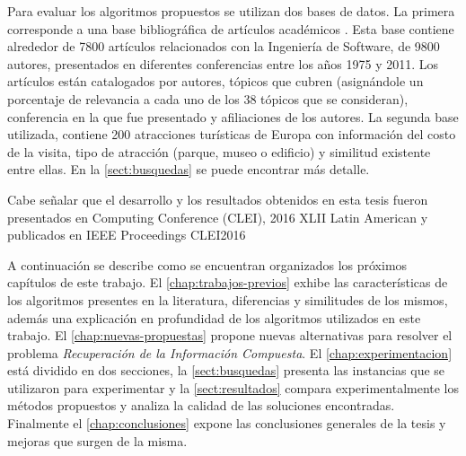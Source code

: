 Para evaluar los algoritmos propuestos se utilizan dos bases de datos. La primera corresponde a una base bibliográfica de artículos académicos \cite{dataDrive}. Esta base contiene alrededor de 7800 artículos relacionados con la Ingeniería de Software, de 9800 autores, presentados en diferentes conferencias entre los años 1975 y 2011. Los artículos están catalogados por autores, tópicos que cubren (asignándole un porcentaje de relevancia a cada uno de los 38 tópicos que se consideran), conferencia en la que fue presentado y afiliaciones de los autores. La segunda base utilizada, contiene 200 atracciones turísticas de Europa con información del costo de la visita, tipo de atracción (parque, museo o edificio) y similitud existente entre ellas. En la \autoref{sect:busquedas} se puede encontrar más detalle.

Cabe señalar que el desarrollo y los resultados obtenidos en esta tesis fueron presentados en  Computing Conference (CLEI), 2016 XLII Latin American y publicados en IEEE Proceedings CLEI2016 \cite{7833376}

A continuación se describe como se encuentran organizados los próximos capítulos de este trabajo. El \autoref{chap:trabajos-previos} exhibe las características de los algoritmos presentes en la literatura, diferencias y similitudes de los mismos, además una explicación en profundidad de los algoritmos utilizados en este trabajo. El \autoref{chap:nuevas-propuestas} propone nuevas alternativas para resolver el problema {\em Recuperación de la Información Compuesta}. El \autoref{chap:experimentacion} está dividido en dos secciones, la \autoref{sect:busquedas} presenta las instancias que se utilizaron para experimentar y la \autoref{sect:resultados} compara experimentalmente los métodos propuestos y analiza la calidad de las soluciones encontradas. Finalmente el \autoref{chap:conclusiones} expone las conclusiones generales de la tesis y mejoras que surgen de la misma.
